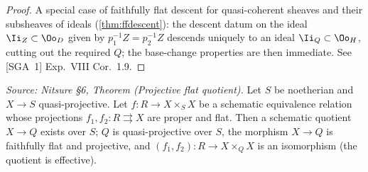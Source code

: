 \begin{proof}
  \leanok
  A special case of faithfully flat descent for quasi-coherent sheaves and their
  subsheaves of ideals (\cref{thm:ffdescent}): the descent datum on the ideal
  $\Ii_Z\subset \Oo_D$ given by $p_1^{-1}Z = p_2^{-1}Z$ descends uniquely to an
  ideal $\Ii_Q\subset \Oo_H$, cutting out the required $Q$; the base-change
  properties are then immediate. See [SGA~1] Exp.~VIII Cor.~1.9.
\end{proof}

\begin{theorem}
  \label{thm:projective-flat-quotient}
  \textit{Source: Nitsure §6, Theorem (Projective flat quotient).}
  Let $S$ be noetherian and $X\to S$ quasi-projective. Let
  $f\colon R\to X\times_S X$ be a schematic equivalence relation whose projections
  $f_1,f_2\colon R\rightrightarrows X$ are proper and flat. Then a schematic
  quotient $X\to Q$ exists over $S$; $Q$ is quasi-projective over $S$, the
  morphism $X\to Q$ is faithfully flat and projective, and
  $(f_1,f_2)\colon R\to X\times_Q X$ is an isomorphism (the quotient is
  effective).
\end{theorem}

